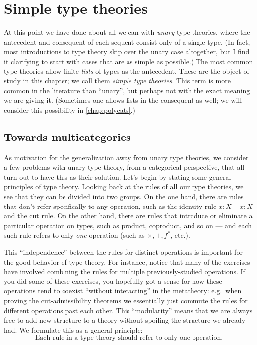 \documentclass{book}
\let\types\vdash
\begin{document}
\chapter{Simple type theories}
\label{chap:simple}

At this point we have done about all we can with \emph{unary} type theories, where the antecedent and consequent of each sequent consist only of a single type.
(In fact, most introductions to type theory skip over the unary case altogether, but I find it clarifying to start with cases that are as simple as possible.)
The most common type theories allow finite \emph{lists} of types as the antecedent.
These are the object of study in this chapter; we call them \emph{simple type theories}.
This term is more common in the literature than ``unary'', but perhaps not with the exact meaning we are giving it.
(Sometimes one allows lists in the consequent as well; we will consider this possibility in \cref{chap:polycats}.)

\section{Towards multicategories}
\label{sec:why-multicats}

As motivation for the generalization away from unary type theories, we consider a few problems with unary type theory, from a categorical perspective, that all turn out to have this as their solution.
Let's begin by stating some general principles of type theory.
Looking back at the rules of all our type theories, we see that they can be divided into two groups.
On the one hand, there are rules that don't refer specifically to any operation, such as the identity rule $x:X \types x:X$ and the cut rule.
On the other hand, there are rules that introduce or eliminate a particular operation on types, such as product, coproduct, and so on --- and each such rule refers to only \emph{one} operation  (such as $\times,+,f^*$, etc.).

This ``independence'' between the rules for distinct operations is important for the good behavior of type theory.
For instance, notice that many of the exercises have involved combining the rules for multiple previously-studied operations.
If you did some of these exercises, you hopefully got a sense for how these operations tend to coexist ``without interacting'' in the metatheory: e.g.\
when proving the cut-admissibility theorems we essentially just commute the rules for different operations past each other.
This ``modularity'' means that we are always free to add new structure to a theory without spoiling the structure we already had.
We formulate this as a general principle:
\begin{equation}\label{princ:independence}
  \text{Each rule in a type theory should refer to only one operation}.\tag{$\ast$}
\end{equation}
\end{document}
